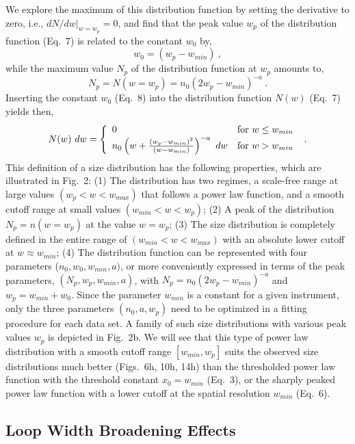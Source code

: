 \documentclass[10pt,preprint]{aastex}  %
\begin{document}
We explore the maximum of this distribution function by setting
the derivative to zero, i.e., $dN/dw|_{w=w_p} =0$, and find that the
peak value $w_p$ of the distribution function (Eq.~7) is related
to the constant $w_0$ by,
\begin{equation}
	w_0 = (w_p - w_{min})	\	,
\end{equation}
while the maximum value $N_p$ of the distribution function at $w_p$
amounts to,
\begin{equation}
	N_p = N(w=w_p) = n_0 (2 w_p - w_{min})^{-a} \ .
\end{equation}
Inserting the constant $w_0$ (Eq.~8) into the distribution function 
$N(w)$ (Eq.~7) yields then,
\begin{equation}
	N(w) \ dw = \left\{
		\begin{array}{ll}
		0	& {\rm for} \ w \le w_{min}	\\
		n_0 \left( {w + {(w_p - w_{min})^2\over (w - w_{min})} } 
		\right)^{-a} \ dw
			& {\rm for} \ w > w_{min}	
		\end{array}
		\right. \ .
\end{equation}
This definition of a size distribution has the following properties,
which are illustrated in Fig.~2:
(1) The distribution has two regimes, a scale-free range 
at large values $(w_p < w < w_{max})$ that follows a power law function,
and a smooth cutoff range at small values $(w_{min} < w < w_p)$;
(2) A peak of the distribution $N_p=n(w=w_p)$ at the value $w=w_p$;
(3) The size distribution is completely defined in the entire range
of $(w_{min} < w < w_{max})$ with an absolute lower cutoff at
$w \approx w_{min}$;
(4) The distribution function can be represented with 
four parameters ($n_0, w_0, w_{min}, a)$, or more conveniently 
expressed in terms of the peak parameters, $(N_p, w_p, w_{min}, a)$,
with $N_p=n_0(2 w_p-w_{min})^{-a}$ and $w_p=w_{min} + w_0$.
Since the parameter $w_{min}$ is a constant for a given 
instrument, only the three parameters $(n_0, a, w_p)$ 
need to be optimized in a fitting procedure for each data set.
A family of such size distributions with various peak values $w_p$
is depicted in Fig.~2b. We will see that this type of power law 
distribution with a smooth cutoff range $[w_{min}, w_p]$ suits 
the observed size distributions much better (Figs.~6h, 10h, 14h)
than the thresholded power law function with the threshold 
constant $x_0 = w_{min}$ (Eq.~3), or the sharply peaked power law 
function with a lower cutoff at the spatial resolution $w_{min}$ 
(Eq.~6).

\subsection{	Loop Width Broadening Effects		}
\end{document}
